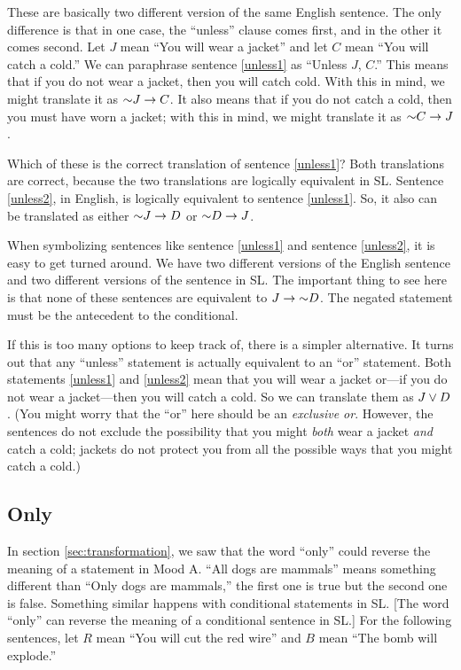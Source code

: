 These are basically two different version of the same English sentence. The only difference is that in one case, the ``unless'' clause comes first, and in the other it comes second. Let $J$ mean ``You will wear a jacket'' and let $C$ mean ``You will catch a cold.'' We can paraphrase sentence \ref{unless1} as ``Unless $J$, $C$.'' This means that if you do not wear a jacket, then you will catch cold. With this in mind, we might translate it as $\mathord{\sim} J \rightarrow C$. It also means that if you do not catch a cold, then you must have worn a jacket; with this in mind, we might translate it as $\mathord{\sim} C \rightarrow J$.

Which of these is the correct translation of sentence \ref{unless1}? Both translations are correct, because the two translations are logically equivalent in SL. Sentence \ref{unless2}, in English, is logically equivalent to sentence \ref{unless1}. So, it also can be translated as either $\mathord{\sim} J \rightarrow D$ or $\mathord{\sim} D \rightarrow J$.

When symbolizing sentences like sentence \ref{unless1} and sentence \ref{unless2}, it is easy to get turned around. We have two different versions of the English sentence and two different versions of the sentence in SL. The important thing to see here is that none of these sentences are equivalent to $J \rightarrow \mathord{\sim} D$. The negated statement must be the antecedent to the conditional.

If this is too many options to keep track of, there is a simpler alternative. It turns out that any ``unless'' statement is actually equivalent to an ``or'' statement. Both statements \ref{unless1} and  \ref{unless2} mean that you will wear a jacket or---if you do not wear a jacket---then you will catch a cold. So we can translate them as $J \lor D$. (You might worry that the ``or'' here should be an \emph{exclusive or}. However, the sentences do not exclude the possibility that you might \emph{both} wear a jacket \emph{and} catch a cold; jackets do not protect you from all the possible ways that you might catch a cold.)



\subsection{Only}

{In section \ref{sec:transformation}, we saw that the word ``only'' could reverse the meaning of a statement in Mood A. ``All dogs are mammals'' means something different than ``Only dogs are mammals,'' the first one is true but the second one is false. Something similar happens with conditional statements in SL.}%
{[The word ``only'' can reverse the meaning of a conditional sentence in SL.]}%
For the following sentences, let $R$ mean ``You will cut the red wire'' and $B$ mean ``The bomb will explode.''

